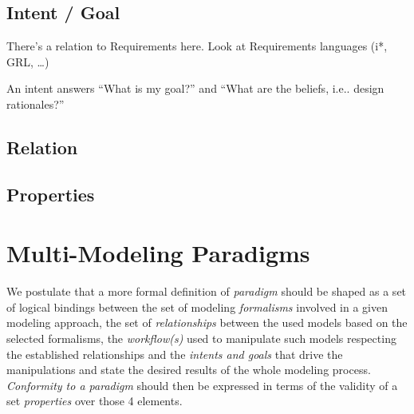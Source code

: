 \subsection{Intent / Goal}
\label{sec:Intent-Goal}

There's a relation to Requirements here. Look at Requirements languages (i*, GRL, \dots)

\begin{definition}[Intent]
    An intent answers ``What is my goal?'' and ``What are the beliefs, i.e.. design rationales?''
\end{definition}


\subsection{Relation}
\label{sec:Relation}


\subsection{Properties}
\label{sec:Properties}


\section{Multi-Modeling Paradigms}
\label{sec:Multi-Paradigms}


\newpage
We postulate that a more formal definition of \textit{paradigm} should be shaped as a set of logical bindings between the set of modeling \textit{formalisms} involved in a given modeling approach, the set of \textit{relationships} between the used models based on the selected formalisms, the \textit{workflow(s)} used to manipulate such models respecting the established relationships and the \textit{intents and goals} that drive the manipulations and state the desired results of the whole modeling process.
\textit{Conformity to a paradigm} should then be expressed in terms of the validity of a set \textit{properties} over those 4 elements.

